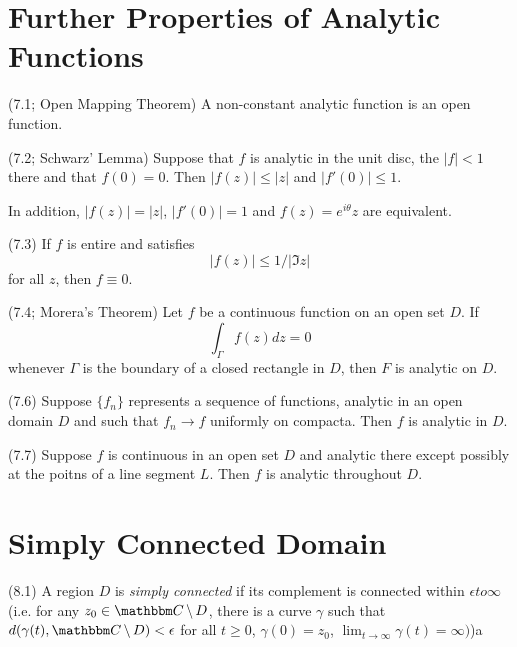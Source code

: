 \documentclass{article}
\begin{document}
\section{Further Properties of Analytic Functions}

\begin{theorem}(7.1; Open Mapping Theorem)
  A non-constant analytic function is an open function.
\end{theorem}

\begin{theorem}(7.2; Schwarz' Lemma)
  Suppose that \(f\) is analytic in the unit disc,
  the \(|f| < 1\) there and that \(f(0) = 0\).
  Then \(|f(z)| \le |z|\) and \(|f'(0)| \le 1\).

  In addition, \(|f(z)| = |z|\), \(|f'(0)| = 1\) and \(f(z) = e^{i\theta}z\) are equivalent.
\end{theorem}

\begin{proposition}(7.3)
  If \(f\) is entire and satisfies
  \[|f(z)| \le 1/|\Im z|\]
  for all \(z\), then \(f \equiv 0\).
\end{proposition}

\begin{theorem}(7.4; Morera's Theorem)
  Let \(f\) be a continuous function on an open set \(D\).
  If
  \[\int_\Gamma f(z) dz = 0\]
  whenever \(\Gamma\) is the boundary of a closed rectangle in \(D\),
  then \(F\) is analytic on \(D\).
\end{theorem}

\begin{theorem}(7.6)
  Suppose \(\{f_n\}\) represents a sequence of functions,
  analytic in an open domain \(D\)
  and such that \(f_n \to f\) uniformly on compacta.
  Then \(f\) is analytic in \(D\).
\end{theorem}

\begin{theorem}(7.7)
  Suppose \(f\) is continuous in an open set \(D\)
  and analytic there except possibly at the poitns of a line segment \(L\).
  Then \(f\) is analytic throughout \(D\).
\end{theorem}

\section{Simply Connected Domain}

\begin{definition}(8.1)
  A region \(D\) is \emph{simply connected}
  if its complement is connected within \(\epsilon to \infty\)
  (i.e. for any \(z_0 \in \bbC \bs D\), there is a curve \(\gamma\)
  such that \(d(\gamma(t), \bbC \bs D) < \epsilon\) for all \(t \ge 0\),
  \(\gamma(0) = z_0\), \(\lim_{t \to \infty} \gamma(t) = \infty)\))a
\end{definition}
\end{document}
